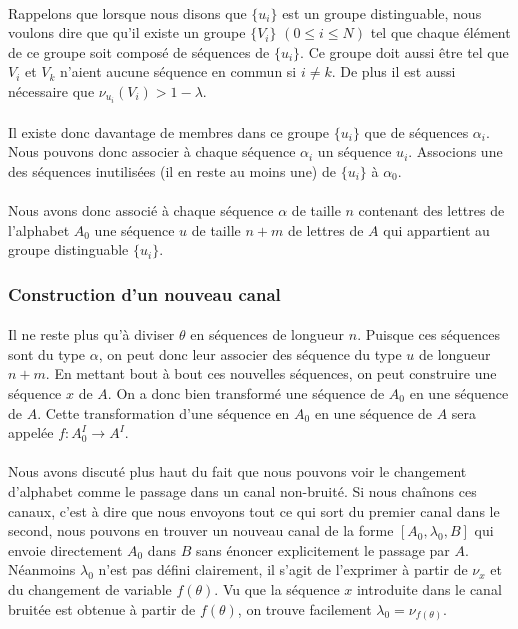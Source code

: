	\paragraph{}
	Rappelons que lorsque nous disons que $\{u_i\}$ est un groupe distinguable, nous voulons dire que qu'il existe un groupe $\{V_i\}$ $(0 \le i \le N)$ 
	tel que chaque élément de ce groupe soit composé de séquences de $\{u_i\}$. Ce groupe doit aussi être tel que $ V_i$ et $V_k$ n'aient aucune séquence
	en commun si $i\neq k$. De plus il est aussi nécessaire que $\nu_{u_i}(V_i) > 1-\lambda$. 
	
	\paragraph{}
	Il existe donc davantage de membres dans ce groupe $\{u_i\}$ que de séquences $\alpha_i$. Nous pouvons donc associer à chaque séquence $\alpha_i$
	un séquence $u_i$. Associons une des séquences inutilisées (il en reste au moins une) de $\{u_i\}$ à $\alpha_0$.
	
	\paragraph{}
	Nous avons donc associé à chaque séquence $\alpha$ de taille $n$ contenant des lettres de l'alphabet $A_0$ une séquence $u$ de taille $n+m$ de
	lettres de $A$ qui appartient au groupe distinguable $\{u_i\}$. 
	
\subsubsection*{Construction d'un nouveau canal}
	
	\paragraph{}
	Il ne reste plus qu'à diviser $\theta$ en séquences de longueur $n$. Puisque ces séquences sont du type $\alpha$, on peut donc leur 
	associer des séquence du type $u$ de longueur $n+m$. En mettant bout à bout ces nouvelles séquences, on peut construire une séquence $x$ de $A$. On a donc bien transformé
	une séquence de $A_0$ en une séquence de $A$. Cette transformation d'une séquence en $A_0$ en une séquence de $A$ sera appelée $f : A_0^I \to A^I$.
	
	\paragraph{}
	Nous avons discuté plus haut du fait que nous pouvons voir le changement d'alphabet comme le passage dans un canal non-bruité. 
	Si nous chaînons ces canaux, c'est à dire que nous envoyons tout ce qui sort du premier canal dans le second,
	nous pouvons en trouver un nouveau canal de la forme $[A_0,\lambda_0,B]$ qui envoie directement $A_0$ dans $B$ 
	sans énoncer explicitement le passage par $A$. Néanmoins $\lambda_0$ n'est pas défini clairement, il s'agit de l'exprimer à partir de $\nu_x$ et
	du changement de variable $f(\theta)$. 
	Vu que la séquence $x$ introduite dans le canal bruitée est obtenue à partir de $f(\theta)$, on trouve facilement $\lambda_0=\nu_{f(\theta)}$.
	
